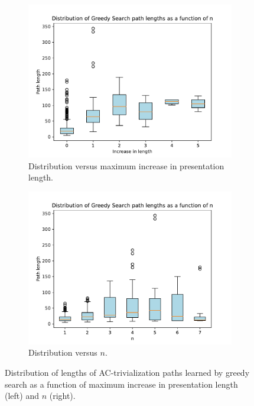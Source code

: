 \begin{figure}
	\centering
	\begin{subfigure}[b]{0.4\textwidth}
		\includegraphics[width=\textwidth]{fig/path_lengths_vs_length_increase.pdf}
		\caption{Distribution versus maximum increase in presentation length.}
		\label{fig:path_lengths_vs_length_increase}
	\end{subfigure}
	\begin{subfigure}[b]{0.4\textwidth}
		\centering
		\includegraphics[width=1.1\textwidth]{fig/gs_path_lengths.pdf}
		\caption{Distribution versus $n$.}
		\label{fig:gs_path_lengths}
	\end{subfigure}%
	\caption{Distribution of lengths of AC-trivialization paths learned by greedy search as a function of maximum increase in presentation length (left) and $n$ (right).} \label{fig:gs_path_length}
\end{figure}

